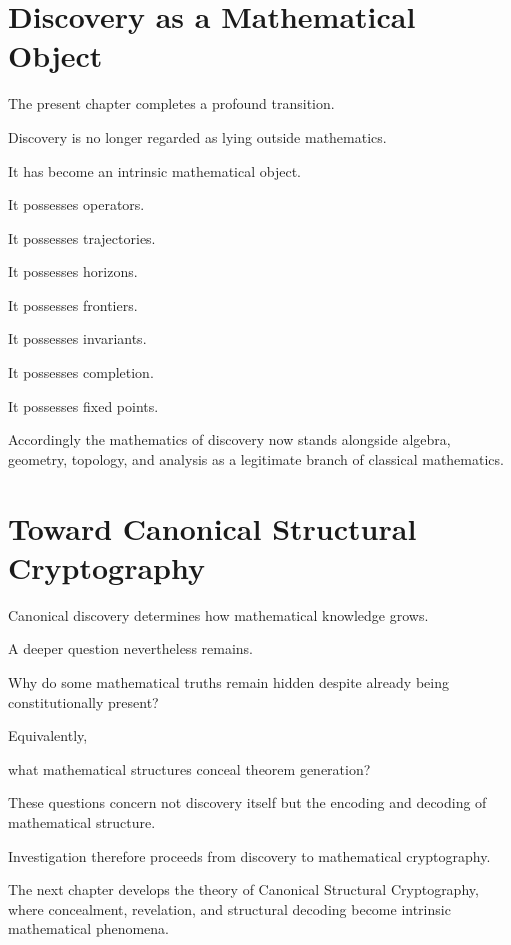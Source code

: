 \documentclass[13pt,openany]{book}
\theoremstyle{plain}
\theoremstyle{definition}
\begin{document}
\section{Discovery as a Mathematical Object}

The present chapter completes a profound transition.

Discovery is no longer regarded as lying outside mathematics.

It has become an intrinsic mathematical object.

It possesses operators.

It possesses trajectories.

It possesses horizons.

It possesses frontiers.

It possesses invariants.

It possesses completion.

It possesses fixed points.

Accordingly the mathematics of discovery now stands alongside algebra,
geometry, topology, and analysis as a legitimate branch of classical
mathematics.

\section{Toward Canonical Structural Cryptography}

Canonical discovery determines how mathematical knowledge grows.

A deeper question nevertheless remains.

Why do some mathematical truths remain hidden despite already being
constitutionally present?

Equivalently,

what mathematical structures conceal theorem generation?

These questions concern not discovery itself but the encoding and decoding of
mathematical structure.

Investigation therefore proceeds from discovery to mathematical cryptography.

The next chapter develops the theory of Canonical Structural Cryptography,
where concealment, revelation, and structural decoding become intrinsic
mathematical phenomena.
\end{document}
